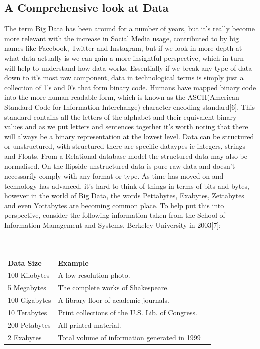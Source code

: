 \documentclass[10pt,journal,compsoc]{IEEEtran}
\begin{document}
\subsection{A Comprehensive look at Data}
The term Big Data has been around for a number of years, but it's really become more relevant with the increase in Social Media usage, contributed to by big names like Facebook, Twitter and Instagram, but if we look in more depth at what data actually is we can gain a more insightful perspective, which in turn will help to understand how data works. Essentially if we break any type of data down to it's most raw component, data in technological terms is simply just a collection of 1's and 0's that form binary code. Humans have mapped binary code into the more human readable form, which is known as the ASCII(American Standard Code for Information Interchange) character encoding standard[6]. This standard contains all the letters of the alphabet and their equivalent binary values and as we put letters and sentences together it's worth noting that there will always be a binary representation at the lowest level. Data can be structured or unstructured, with structured there are specific dataypes ie integers, strings and Floats. From a Relational database model the structured data may also be normalised. On the flipside unstructured data is pure raw data and doesn't necessarily comply with any format or type. As time has moved on and technology has advanced, it's hard to think of things in terms of bits and bytes, however in the world of Big Data, the words Pettabytes, Exabytes, Zettabytes and even Yottabytes are becoming common place. To help put this into perspective, consider the following information taken from the School of Information Management and Systems, Berkeley University in 2003[7];\\\\\\
\begin{tabular}{lp{}r}
	\bfseries Data Size & \bfseries Example &
	\bfseries  \\[1ex]
	100 Kilobytes & A low resolution photo. \\
	5 Megabytes & The complete works of Shakespeare. \\
	100 Gigabytes & A library floor of academic journals. \\
	10 Terabytes & Print collections of the U.S. Lib. of Congress. \\
	200 Petabytes & All printed material. \\
	2 Exabytes & Total volume of information generated in 1999
\end{tabular}\\\\\\
\end{document}
